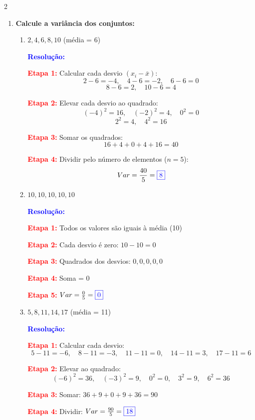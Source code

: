 \documentclass[11pt]{article}
\newcommand{\respostaNum}[1]{\textcolor{blue}{\boxed{#1}}}
\newcommand{\resolucao}{\textbf{\textcolor{blue}{Resolução:}}}
\begin{document}
\begin{multicols}{2}
\begin{enumerate}[leftmargin=*]
\begin{enumerate}[label=\alph*)]
\textbf{\textcolor{red}{Etapa 3:}} $A = 30 - 5 = \respostaNum{25}$
\end{enumerate}

\item \textbf{Calcule a variância dos conjuntos:}

\begin{enumerate}[label=\alph*)]
\item $2, 4, 6, 8, 10$ (média = 6)

\resolucao

\textbf{\textcolor{red}{Etapa 1:}} Calcular cada desvio $(x_i - \bar{x})$:
\[2-6 = -4,\quad 4-6 = -2,\quad 6-6 = 0 \]
\[8-6 = 2,\quad 10-6 = 4\]

\textbf{\textcolor{red}{Etapa 2:}} Elevar cada desvio ao quadrado:
\[(-4)^2 = 16,\quad (-2)^2 = 4,\quad 0^2 = 0\]
\[ 2^2 = 4,\quad 4^2 = 16\]

\textbf{\textcolor{red}{Etapa 3:}} Somar os quadrados:
\[
16 + 4 + 0 + 4 + 16 = 40
\]

\textbf{\textcolor{red}{Etapa 4:}} Dividir pelo número de elementos ($n = 5$):
\[
Var = \frac{40}{5} = \respostaNum{8}
\]

\item $10, 10, 10, 10, 10$

\resolucao

\textbf{\textcolor{red}{Etapa 1:}} Todos os valores são iguais à média (10)

\textbf{\textcolor{red}{Etapa 2:}} Cada desvio é zero: $10-10 = 0$

\textbf{\textcolor{red}{Etapa 3:}} Quadrados dos desvios: $0, 0, 0, 0, 0$

\textbf{\textcolor{red}{Etapa 4:}} Soma = 0

\textbf{\textcolor{red}{Etapa 5:}} $Var = \frac{0}{5} = \respostaNum{0}$

\item $5, 8, 11, 14, 17$ (média = 11)

\resolucao

\textbf{\textcolor{red}{Etapa 1:}} Calcular cada desvio:
\[
5-11 = -6,\quad 8-11 = -3,\quad 11-11 = 0,\quad 14-11 = 3,\quad 17-11 = 6
\]

\textbf{\textcolor{red}{Etapa 2:}} Elevar ao quadrado:
\[
(-6)^2 = 36,\quad (-3)^2 = 9,\quad 0^2 = 0,\quad 3^2 = 9,\quad 6^2 = 36
\]

\textbf{\textcolor{red}{Etapa 3:}} Somar: $36 + 9 + 0 + 9 + 36 = 90$

\textbf{\textcolor{red}{Etapa 4:}} Dividir: $Var = \frac{90}{5} = \respostaNum{18}$
\end{enumerate}


\end{enumerate}
\end{multicols}
\end{document}
